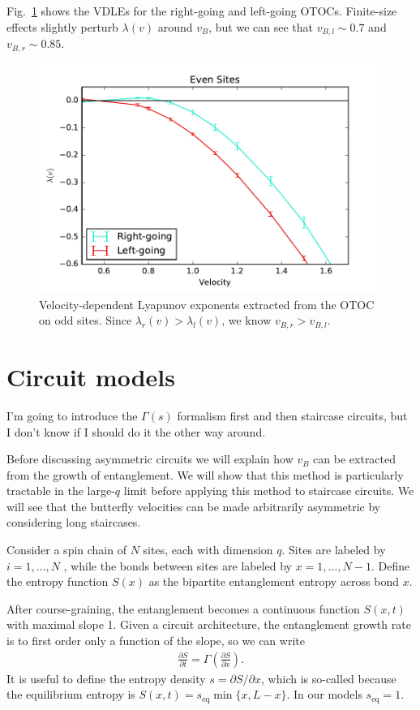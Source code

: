 \documentclass[aps,prx,reprint,superscriptaddress, longbibliography]{revtex4-1}
\newcommand{\charlie}[1]{ {\color{Magenta} {{#1}}}}
\begin{document}
Fig.~\ref{fig:vdle} shows the VDLEs for the right-going and left-going OTOCs. Finite-size effects slightly perturb $\lambda(v)$ around $v_B$, but we can see that $v_{B,l} \sim 0.7$ and $v_{B,r} \sim 0.85$.

\begin{figure}
	\includegraphics[width=\columnwidth]{vdle}
	\caption{Velocity-dependent Lyapunov exponents extracted from the OTOC on odd sites. Since $\lambda_r(v)>\lambda_l(v)$, we know $v_{B,r}>v_{B,l}$.}
	\label{fig:vdle}
\end{figure}

\section{Circuit models} \label{sec:circ}

\charlie{I'm going to introduce the $\Gamma(s)$ formalism first and then staircase circuits, but I don't know if I should do it the other way around.}

Before discussing asymmetric circuits we will explain how $v_B$ can be extracted from the growth of entanglement. We will show that this method is particularly tractable in the large-$q$ limit before applying this method to staircase circuits. We will see that the butterfly velocities can be made arbitrarily asymmetric by considering long staircases.

Consider a spin chain of $N$ sites, each with dimension $q$. Sites are labeled by $i = 1,\dots, N$ , while the bonds between sites are labeled by $x = 1, \dots, N − 1$. Define the entropy function $S(x)$ as the bipartite entanglement entropy across bond $x$. 

After course-graining, the entanglement becomes a continuous function $S(x,t)$ with maximal slope 1. Given a circuit architecture, the entanglement growth rate is to first order only a function of the slope, so we can write \cite{jonay}
\begin{align}
\frac{\partial S}{\partial t} = \Gamma\left(\frac{\partial S}{\partial x}\right).
\end{align}
It is useful to define the entropy density $s = \partial S / \partial x$, which is so-called because the equilibrium entropy is $S(x, t) = s_\text{eq} \min\{x, L - x\}$. In our models $s_\text{eq} = 1$.
\end{document}
